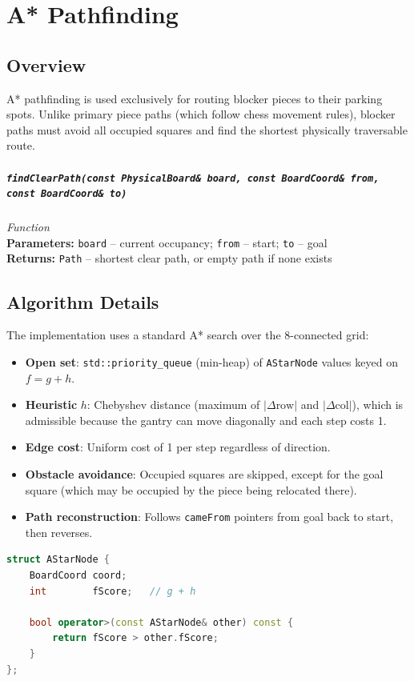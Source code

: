 \documentclass[11pt,a4paper]{report}
\newcommand{\function}[4]{%
    \paragraph{\texttt{#1}} \hfill \textit{#2}\\
    \textbf{Parameters:} #3\\
    \textbf{Returns:} #4
}
\begin{document}
\chapter{A* Pathfinding}

\section{Overview}

A* pathfinding is used exclusively for routing blocker pieces to their parking spots. Unlike primary piece paths (which follow chess movement rules), blocker paths must avoid all occupied squares and find the shortest physically traversable route.

\function{findClearPath(const PhysicalBoard\& board, const BoardCoord\& from, const BoardCoord\& to)}{Function}{\texttt{board} -- current occupancy; \texttt{from} -- start; \texttt{to} -- goal}{\texttt{Path} -- shortest clear path, or empty path if none exists}

\section{Algorithm Details}

The implementation uses a standard A* search over the 8-connected grid:

\begin{itemize}
    \item \textbf{Open set}: \texttt{std::priority\_queue} (min-heap) of \texttt{AStarNode} values keyed on $f = g + h$.
    \item \textbf{Heuristic} $h$: Chebyshev distance (maximum of $|\Delta\text{row}|$ and $|\Delta\text{col}|$), which is admissible because the gantry can move diagonally and each step costs 1.
    \item \textbf{Edge cost}: Uniform cost of 1 per step regardless of direction.
    \item \textbf{Obstacle avoidance}: Occupied squares are skipped, except for the goal square (which may be occupied by the piece being relocated there).
    \item \textbf{Path reconstruction}: Follows \texttt{cameFrom} pointers from goal back to start, then reverses.
\end{itemize}

\begin{lstlisting}[language=C++, caption={AStarNode definition}]
struct AStarNode {
    BoardCoord coord;
    int        fScore;   // g + h

    bool operator>(const AStarNode& other) const {
        return fScore > other.fScore;
    }
};
\end{lstlisting}
\end{document}
